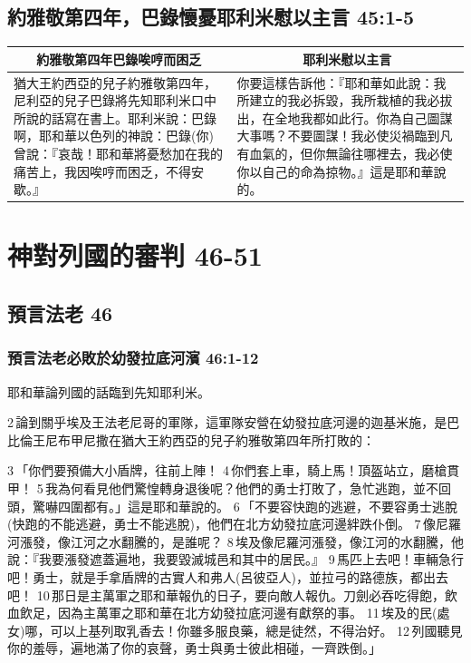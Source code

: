 \subsection{約雅敬第四年，巴錄懷憂耶利米慰以主言 45:1-5}
\begin{table}[H]
\centering
\begin{tabular}{p{8.5cm}|p{8.50cm}}\hline\hline
\multicolumn{1}{c|}{約雅敬第四年巴錄唉哼而困乏}&\multicolumn{1}{c}{耶利米慰以主言}\\\hline
猶大王約西亞的兒子約雅敬第四年，尼利亞的兒子巴錄將先知耶利米口中所說的話寫在書上。耶利米說：巴錄啊，耶和華以色列的神說：巴錄(你)曾說：『哀哉！耶和華將憂愁加在我的痛苦上，我因唉哼而困乏，不得安歇。』
&你要這樣告訴他：『耶和華如此說：我所建立的我必拆毀，我所栽植的我必拔出，在全地我都如此行。你為自己圖謀大事嗎？不要圖謀！我必使災禍臨到凡有血氣的，但你無論往哪裡去，我必使你以自己的命為掠物。』這是耶和華說的。\\\hline
\end{tabular}
\end{table}



\section{神對列國的審判 46-51}
\subsection{預言法老 46}
\subsubsection{預言法老必敗於幼發拉底河濱 46:1-12}
耶和華論列國的話臨到先知耶利米。

2 論到關乎埃及王法老尼哥的軍隊，這軍隊安營在幼發拉底河邊的迦基米施，是巴比倫王尼布甲尼撒在猶大王約西亞的兒子約雅敬第四年所打敗的：

3 「你們要預備大小盾牌，往前上陣！ 4 你們套上車，騎上馬！頂盔站立，磨槍貫甲！ 5 我為何看見他們驚惶轉身退後呢？他們的勇士打敗了，急忙逃跑，並不回頭，驚嚇四圍都有。」這是耶和華說的。 6 「不要容快跑的逃避，不要容勇士逃脫(快跑的不能逃避，勇士不能逃脫)，他們在北方幼發拉底河邊絆跌仆倒。 7 像尼羅河漲發，像江河之水翻騰的，是誰呢？ 8 埃及像尼羅河漲發，像江河的水翻騰，他說：『我要漲發遮蓋遍地，我要毀滅城邑和其中的居民。』 9 馬匹上去吧！車輛急行吧！勇士，就是手拿盾牌的古實人和弗人(呂彼亞人)，並拉弓的路德族，都出去吧！ 10 那日是主萬軍之耶和華報仇的日子，要向敵人報仇。刀劍必吞吃得飽，飲血飲足，因為主萬軍之耶和華在北方幼發拉底河邊有獻祭的事。 11 埃及的民(處女)哪，可以上基列取乳香去！你雖多服良藥，總是徒然，不得治好。 12 列國聽見你的羞辱，遍地滿了你的哀聲，勇士與勇士彼此相碰，一齊跌倒。」

